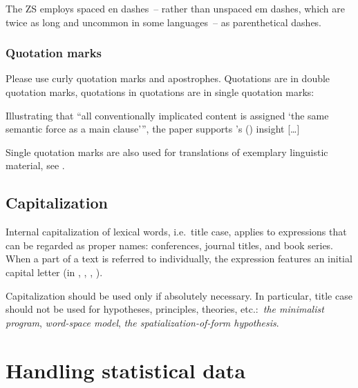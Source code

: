 \documentclass{zsarticle}
\begin{document}
\begin{zsquote}
The ZS employs spaced en dashes~-- rather than unspaced em dashes, which are twice as long and uncommon in some languages~-- as parenthetical dashes.
\end{zsquote}

\subsubsection{Quotation marks}\label{sec:quotes}

Please use curly quotation marks and apostrophes. Quotations are in double quotation marks, quotations in quotations are in single quotation marks:

\begin{zsquote}
Illustrating that \enquote{all conventionally implicated content is assigned \enquote*{the same semantic force as a main clause}}, the paper supports \citeauthor{potts2005}'s (\citeyear{potts2005}) insight [\ldots]
\end{zsquote}

Single quotation marks are also used for translations of exemplary linguistic material, see .

\subsection{Capitalization}\label{sec:capitalization}

Internal capitalization of lexical words, i.e.\ title case, applies to expressions that can be regarded as proper names: conferences, journal titles, and book series. When a part of a text is referred to individually, the expression features an initial capital letter (in , , , ).

Capitalization should be used only if absolutely necessary. In particular, title case should not be used for hypotheses, principles, theories, etc.:\ \emph{the minimalist program}, \emph{word-space model}, \emph{the spatialization-of-form hypothesis}.

\section{Handling statistical data}\label{sec:stats}
\end{document}
